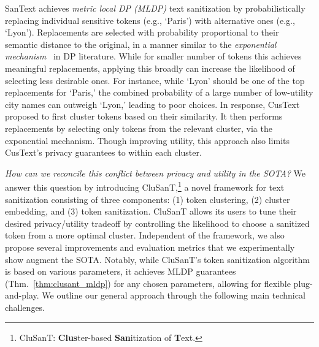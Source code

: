 \documentclass[11pt]{article}
\newcommand{\clusant}{CluSanT\xspace}
\begin{document}
SanText achieves {\em metric local DP (MLDP)} text sanitization by probabilistically replacing individual sensitive tokens (e.g., `Paris') with alternative ones (e.g., `Lyon'). Replacements are selected with probability proportional to their semantic distance to the original, in a manner similar to the {\em exponential mechanism}~\cite{mcsherry2007mechanism} in DP literature. 
While for smaller number of tokens this achieves meaningful replacements, applying this broadly can 
increase the likelihood of selecting less desirable ones. 
%
For instance, while `Lyon' should be one of the top replacements for `Paris,' the combined probability of a large number of low-utility city names can outweigh `Lyon,' leading to poor choices.
%
%
In response, CusText proposed to first cluster tokens based on their similarity. It then performs replacements by selecting only tokens from the relevant cluster, via the exponential mechanism.  
%
Though improving utility, this approach also limits CusText's privacy guarantees to within each cluster.


{\em How can we reconcile this conflict between privacy and utility in the SOTA?} We answer this question by introducing \clusant,\footnote{\clusant: \textbf{Clus}ter-based \textbf{San}itization of \textbf{T}ext.} a novel framework for text sanitization consisting of three components: (1) token clustering, (2) cluster embedding, and (3) token sanitization. \clusant  allows its users to tune their desired privacy/utility tradeoff by controlling the likelihood to choose a sanitized token from a more optimal cluster. Independent of the framework, we also propose several improvements and evaluation metrics that we experimentally show augment the SOTA.  
Notably, while \clusant's token sanitization algorithm is based on various parameters, %
it achieves MLDP guarantees (Thm.~\ref{thm:clusant_mldp}) for any chosen parameters, allowing for flexible plug-and-play. 
We outline our general approach through the following main technical challenges.
\end{document}
